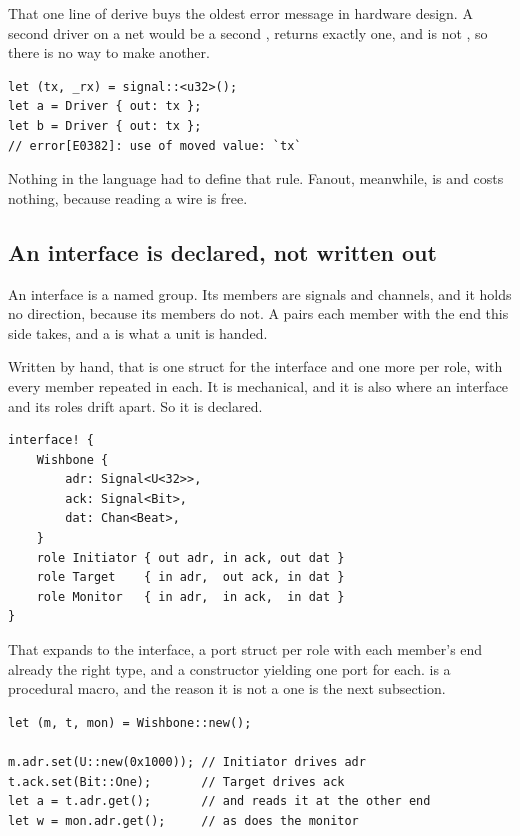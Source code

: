 That one line of derive buys the oldest error message in hardware design.
A second driver on a net would be a second , 
returns exactly one, and  is not , so there is no
way to make another.

\begin{lstlisting}[caption={Two drivers on one wire. The classic multiple-driver error is a move error.},label={lst:twodrivers}]
let (tx, _rx) = signal::<u32>();
let a = Driver { out: tx };
let b = Driver { out: tx };
// error[E0382]: use of moved value: `tx`
\end{lstlisting}

Nothing in the language had to define that rule. Fanout, meanwhile, is
 and costs nothing, because reading a wire is free.

\subsection{An interface is declared, not written out}

An interface is a named group. Its members are signals and channels, and
it holds no direction, because its members do not. A  pairs
each member with the end this side takes, and a  is what a unit
is handed.

Written by hand, that is one struct for the interface and one more per
role, with every member repeated in each. It is mechanical, and it is also
where an interface and its roles drift apart. So it is declared.

\begin{lstlisting}[caption={Complete interface declaration and its two roles; all supporting definitions are generated automatically.},label={lst:iface}]
interface! {
    Wishbone {
        adr: Signal<U<32>>,
        ack: Signal<Bit>,
        dat: Chan<Beat>,
    }
    role Initiator { out adr, in ack, out dat }
    role Target    { in adr,  out ack, in dat }
    role Monitor   { in adr,  in ack,  in dat }
}
\end{lstlisting}

That expands to the interface, a port struct per role with each member's
end already the right type, and a constructor yielding one port for each.
 is a procedural macro, and the reason it is not a
 one is the next subsection.

\begin{lstlisting}[caption={Using it. Driving the wrong end is a missing method, not a convention.},label={lst:iface-use}]
let (m, t, mon) = Wishbone::new();

m.adr.set(U::new(0x1000)); // Initiator drives adr
t.ack.set(Bit::One);       // Target drives ack
let a = t.adr.get();       // and reads it at the other end
let w = mon.adr.get();     // as does the monitor
\end{lstlisting}

